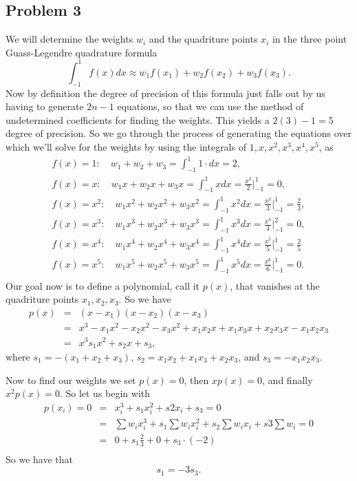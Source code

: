 \documentclass[12pt]{amsart}
\begin{document}
\begin{onehalfspace}
        \section{Problem 3}
        We will determine the weights $w_i$ and the quadriture points $x_i$ in the three point Guass-Legendre
        quadrature formula
        \[
            \int_{-1}^1 f(x) dx \approx w_1 f(x_1) + w_2 f(x_2) + w_3 f(x_3).
        \]
        Now by definition the degree of precision of this formula just falls out by us having to generate $2n-1$
        equations, so that we can use the method of undetermined coefficients for finding the weights.
        This yields a $2(3) - 1 = 5$ degree of precision.
        So we go through the process of generating the equations over which we'll solve for the weights by using the integrals
        of $1,x,x^2,x^3,x^4,x^5$, as
        \begin{gather*}
            f(x) = 1:\quad w_1 + w_2 + w_3 = \int_{-1}^1 1\cdot dx = 2, \\
            f(x) = x:\quad w_1 x + w_2 x + w_3 x = \int_{-1}^1 x dx = \frac{x^2}{2}\bigg|_{-1}^1 = 0,\\
            f(x) = x^2:\quad w_1 x^2 + w_2 x^2 + w_3 x^2 = \int_{-1}^1 x^2 dx = \frac{x^3}{3}\bigg|_{-1}^1 = \frac{2}{3},\\
            f(x) = x^3:\quad w_1 x^3 + w_2 x^3 + w_3 x^3 = \int_{-1}^1 x^3 dx = \frac{x^4}{4}\bigg|_{-1}^2 = 0,\\
            f(x) = x^4:\quad w_1 x^4 + w_2 x^4+ w_3 x^4 = \int_{-1}^1 x^4 dx = \frac{x^5}{5}\bigg|_{-1}^1 = \frac{2}{5}\\
            f(x) = x^5:\quad w_1 x^5 + w_2 x^5+ w_3 x^5 = \int_{-1}^1 x^5 dx = \frac{x^6}{6}\bigg|_{-1}^1 = 0.\\
        \end{gather*}
        Our goal now is to define a polynomial, call it $p(x)$, that vanishes at the quadriture points $x_1, x_2, x_3$.
        So we have
        \begin{eqnarray*}
            p(x) & = & (x - x_1)(x - x_2)(x - x_3)\\
            & = & x^3 - x_1 x^2 - x_2 x^2 - x_3 x^2 + x_1 x_2 x + x_1 x_3 x + x_2 x_3 x - x_1 x_2 x_3\\
            & = & x^3 s_1 x^2 + s_2 x + s_3,
        \end{eqnarray*}
        where $s_1 = -(x_1 + x_2 + x_3)$, $s_2 = x_1 x_2 + x_1 x_3 + x_2 x_3$, and $s_3 = - x_1 x_2 x_3$.

        Now to find our weights we set $p(x)=0$, then $xp(x)=0$, and finally $x^2 p(x) = 0$.
        So let us begin with
        \begin{eqnarray*}
            p(x_i) = 0 & = & x_i^3 + s_1 x_i^2 + s2 x_i + s_3  = 0\\
            & = & \sum w_i x_i^3 + s_1 \sum w_i x_i^2 + s_2 \sum w_i x _i + s3 \sum w_i = 0\\
            & = & 0 + s_1\frac{2}{3} + 0 + s_3 \cdot (-2)\\
        \end{eqnarray*}
        So we have that
        \[
            s_1 = -3s_3.
        \]


\end{onehalfspace}
\end{document}
